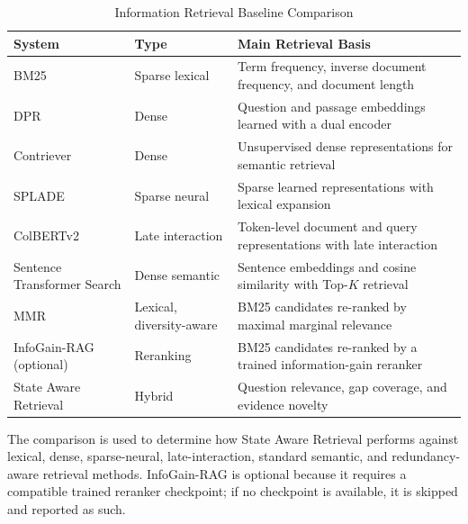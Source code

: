 \documentclass[12pt,a4paper]{report}
\begin{document}
\begin{table}[H]
\centering
\caption{Information Retrieval Baseline Comparison}
\label{tab:baseline-comparison}
\renewcommand{\arraystretch}{1.2}
\begin{tabular}{|p{1.55in}|p{1.40in}|p{3.10in}|}
\hline
\textbf{System} & \textbf{Type} & \textbf{Main Retrieval Basis} \\ \hline
BM25 & Sparse lexical &
Term frequency, inverse document frequency, and document length
\cite{robertson2009bm25} \\ \hline

DPR & Dense &
Question and passage embeddings learned with a dual encoder
\cite{karpukhin2020dpr} \\ \hline

Contriever & Dense &
Unsupervised dense representations for semantic retrieval
\cite{izacard2022contriever} \\ \hline

SPLADE & Sparse neural &
Sparse learned representations with lexical expansion
\cite{formal2021splade} \\ \hline

ColBERTv2 & Late interaction &
Token-level document and query representations with late interaction
\cite{santhanam2022colbertv2} \\ \hline

Sentence Transformer Search & Dense semantic &
Sentence embeddings and cosine similarity with Top-$K$ retrieval
\cite{reimers2019sentence} \\ \hline

MMR & Lexical, diversity-aware &
BM25 candidates re-ranked by maximal marginal relevance
\cite{carbonell1998mmr} \\ \hline

InfoGain-RAG (optional) & Reranking &
BM25 candidates re-ranked by a trained information-gain reranker
\cite{wang2025infogain} \\ \hline

State Aware Retrieval & Hybrid &
Question relevance, gap coverage, and evidence novelty \\ \hline
\end{tabular}
\end{table}

The comparison is used to determine how State Aware Retrieval performs
against lexical, dense, sparse-neural, late-interaction, standard
semantic, and redundancy-aware retrieval methods. InfoGain-RAG is optional because it requires a compatible trained reranker checkpoint; if no checkpoint is available, it is skipped and reported as such.
\end{document}
